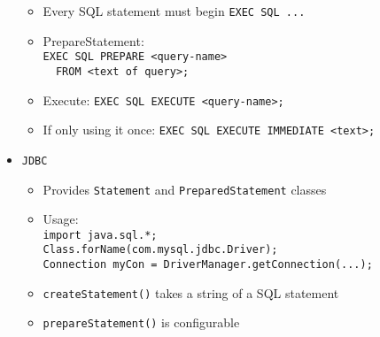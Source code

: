 \documentclass[landscape,8pt]{extarticle}
\newcommand{\code}{\lstinline}
\begin{document}
\begin{multicols}{4}
\begin{itemize}
\begin{itemize}
        \item Every SQL statement must begin \code{EXEC SQL ...}
        \item PrepareStatement:\\
\code{EXEC SQL PREPARE <query-name>}\\
\code{  FROM <text of query>;}
        \item Execute: \code{EXEC SQL EXECUTE <query-name>;}
        \item If only using it once:
\code{EXEC SQL EXECUTE IMMEDIATE <text>;}
        \end{itemize}
        \item \code{JDBC}
    \begin{itemize}
        \item Provides \code{Statement} and \code{PreparedStatement} classes
        \item Usage:\\
\code{import java.sql.*;}\\
\code{Class.forName(com.mysql.jdbc.Driver);}\\
\code{Connection myCon = DriverManager.getConnection(...);}
        \item \code{createStatement()} takes a string of a SQL statement
        \item \code{prepareStatement()} is configurable
    \end{itemize}
\end{itemize}
    \end{multicols}
\end{document}
